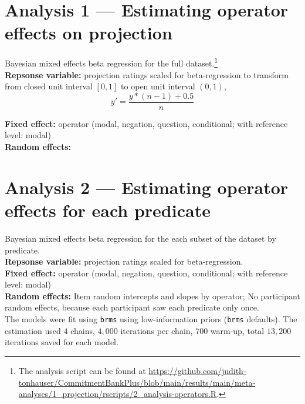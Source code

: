 \documentclass[11pt,fleqn]{article}
\newcommand{\6}{\mbox{$[\hspace*{-.6mm}[$}}
\newcommand{\9}{\mbox{$]\hspace*{-.6mm}]$}}
\begin{document}
\section{Analysis 1 --- Estimating operator effects on projection}

    Bayesian mixed effects beta regression for the full dataset.\footnote{The analysis script can be found at \url{https://github.com/judith-tonhauser/CommitmentBankPlus/blob/main/results/main/meta-analyses/1_projection/rscripts/2_analysis-operators.R}.}\\

    \noindent\textbf{Repsonse variable:} projection ratings scaled for beta-regression to transform from closed unit interval $[0,1]$ to open unit interval $(0,1)$,
    $$y' = \frac{y * (n - 1) + 0.5}{n}$$

    \noindent\textbf{Fixed effect:} operator (modal, negation, question, conditional; with reference level: modal)\\

    \noindent\textbf{Random effects:} 


\section{Analysis 2 --- Estimating operator effects for each predicate}

    Bayesian mixed effects beta regression for the each subset of the dataset by predicate.\\

    \noindent\textbf{Repsonse variable:} projection ratings scaled for beta-regression.\\

    \noindent\textbf{Fixed effect:} operator (modal, negation, question, conditional; with reference level: modal)\\

    \noindent\textbf{Random effects:} Item random intercepts and slopes by operator; No participant random effects, because each participant saw each predicate only once.\\

    \noindent The models were fit using \texttt{brms}
    using low-information priors (\texttt{brms} defaults). The estimation used $4$ chains, $4,000$ iterations per chain, $700$ warm-up, total $13,200$ iterations saved for each model.
\end{document}
